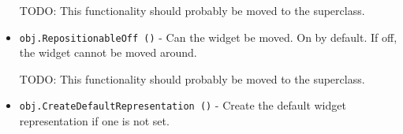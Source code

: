 \begin{itemize}
 TODO: This functionality should probably be moved to the superclass.

\item  \verb|obj.RepositionableOff ()| -  Can the widget be moved. On by default. If off, the widget cannot be moved
 around.

 TODO: This functionality should probably be moved to the superclass.

\item  \verb|obj.CreateDefaultRepresentation ()| -  Create the default widget representation if one is not set. 

\end{itemize}
